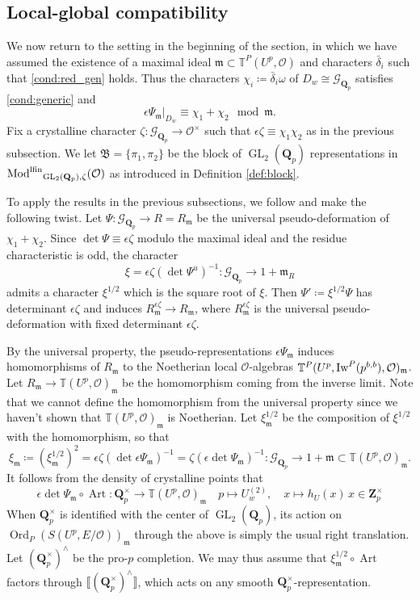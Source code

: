 \documentclass[leqno]{amsart}
\theoremstyle{definition}
\theoremstyle{remark}
\newcommand{\oo}{\mathcal{O}}
\newcommand{\Qp}{\mathbf{Q}_p}
\newcommand{\Zp}{\mathbf{Z}_p}
\DeclareMathOperator{\GL}{GL}
\DeclareMathOperator{\Art}{Art}
\newcommand{\fm}{\mathfrak{m}}
\DeclareMathOperator{\lfMod}{\textnormal{Mod}^{\textnormal{lfin}}}
\DeclareMathOperator{\Ord}{Ord} %
\newcommand{\Gp}{\mathcal{G}_{\Qp}} %
\newcommand{\B}{\mathfrak B} %
\newcommand{\Iw}{\textnormal{Iw}} %
\newcommand{\TT}{\mathbb{T}} %
\begin{document}
\subsection{Local-global compatibility}
\label{sub:compatible}

We now return to the setting in 
the beginning of the section,
in which we have assumed 
the existence of
a maximal ideal $\fm\subset \TT^P(U^p,\oo)$ 
and characters $\bar{\delta}_i$
such that \eqref{cond:red_gen} holds.
Thus the characters
$\chi_i\coloneqq\bar{\delta}_i\omega$
of $D_w\cong \Gp$
satisfies \eqref{cond:generic} and
\[
	\epsilon\Psi_\fm\vert_{D_w}\equiv
	\chi_1+\chi_2 \mod \fm.
\]
Fix a crystalline character 
$\zeta\colon \Gp\to \oo^\times$ 
such that $\epsilon\zeta\equiv \chi_1\chi_2$
as in the previous subsection.
We let $\B=\{\pi_1,\pi_2\}$
be the block of $\GL_2(\Qp)$
representations
in $\lfMod_{\GL_2(\Qp),\zeta}(\oo)$
as introduced in Definition \ref{def:block}.


To apply the results in the previous subsections,
we follow \cite{urban} and make the following twist.
Let $\Psi\colon \Gp\to R=R_{\fm}$ be 
the universal pseudo-deformation of $\chi_1+\chi_2$.
Since $\det\Psi\equiv \epsilon\zeta$ modulo the 
maximal ideal and the residue characteristic is odd,
the character
\[
	\xi=\epsilon\zeta(\det \Psi^u)^{-1}\colon
	\Gp\to 1+\fm_R
\]
admits a character $\xi^{1/2}$ which is the square root of $\xi$.
Then  $\Psi'\coloneqq \xi^{1/2}\Psi$ has determinant $\epsilon\zeta$
and induces $R_\fm^{\epsilon\zeta}\to R_\fm$,
where $R_\fm^{\epsilon\zeta}$ is the universal 
pseudo-deformation with fixed determinant $\epsilon\zeta$.

By the universal property,
the pseudo-representations
$\epsilon\Psi_{\fm}$
induces homomorphisms of $R_\fm$ 
to the Noetherian local $\oo$-algebras
$\TT^P(U^p,\Iw^P(p^{b,b}),\oo)_{\fm}$.
Let $R_{\fm}\to \TT(U^p,\oo)_{\fm}$
be the homomorphism
coming from the inverse limit.
Note that we cannot define the homomorphism
from the universal property
since we haven't shown that
$\TT(U^p,\oo)_{\fm}$ is Noetherian.
Let $\xi_\fm^{1/2}$ be the  composition 
of $\xi^{1/2}$ with the homomorphism,
so that 
\[
	\xi_\fm\coloneqq(\xi_\fm^{1/2})^2=
	\epsilon\zeta(\det \epsilon\Psi_\fm)^{-1}
	=\zeta(\epsilon\det \Psi_\fm)^{-1}\colon
	\Gp\to 1+\fm\subset \TT(U^p,\oo)_\fm.
\]
It follows from the density of crystalline points
that 
\[
	\epsilon\det\Psi_\fm\circ \Art\colon
	\Qp^\times\to \TT(U^p,\oo)_{\fm}\quad
	p\mapsto U_w^{(2)},\quad
	x\mapsto h_U(x)\,x\in\Zp^\times
\]
When $\Qp^\times$
is identified with the center of  $\GL_2(\Qp)$,
its action on $\Ord_P(S(U^p,E/\oo))_{\fm}$
through the above
is simply the usual right translation.
Let $(\Qp^\times)^\wedge$ be the pro-$p$ completion. 
We may thus assume that 
$\xi_{\fm}^{1/2}\circ \Art$
factors through $\llbracket (\Qp^\times)^\wedge\rrbracket$,
which acts on any smooth $\Qp^\times$-representation.
\end{document}
